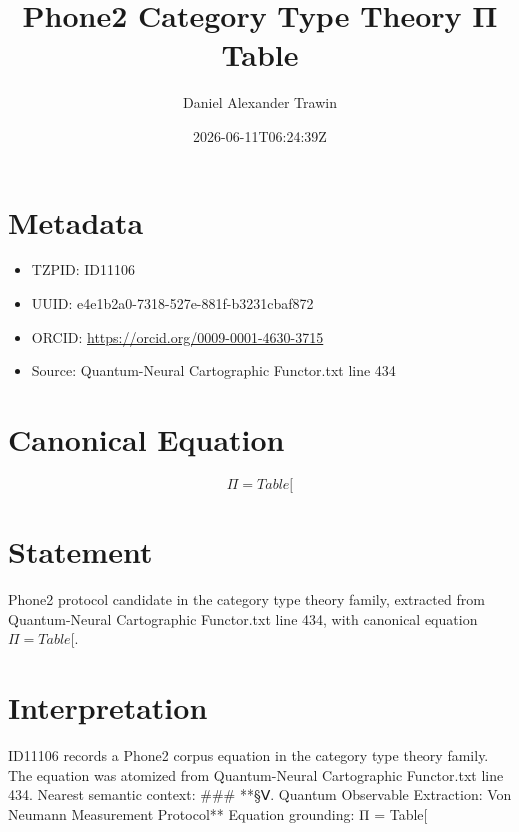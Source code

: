 \documentclass[11pt]{article}
\title{Phone2 Category Type Theory Π Table}
\author{Daniel Alexander Trawin}
\date{2026-06-11T06:24:39Z}
\begin{document}
\maketitle
\section*{Metadata}
\begin{itemize}
\item TZPID: ID11106
\item UUID: e4e1b2a0-7318-527e-881f-b3231cbaf872
\item ORCID: \url{https://orcid.org/0009-0001-4630-3715}
\item Source: Quantum-Neural Cartographic Functor.txt line 434
\end{itemize}
\section*{Canonical Equation}
\[
Π = Table[
\]
\section*{Statement}
Phone2 protocol candidate in the category type theory family, extracted from Quantum-Neural Cartographic Functor.txt line 434, with canonical equation $Π = Table[$.
\section*{Interpretation}
ID11106 records a Phone2 corpus equation in the category type theory family. The equation was atomized from Quantum-Neural Cartographic Functor.txt line 434. Nearest semantic context: ### **§Ⅴ. Quantum Observable Extraction: Von Neumann Measurement Protocol** Equation grounding: Π = Table[
\end{document}
